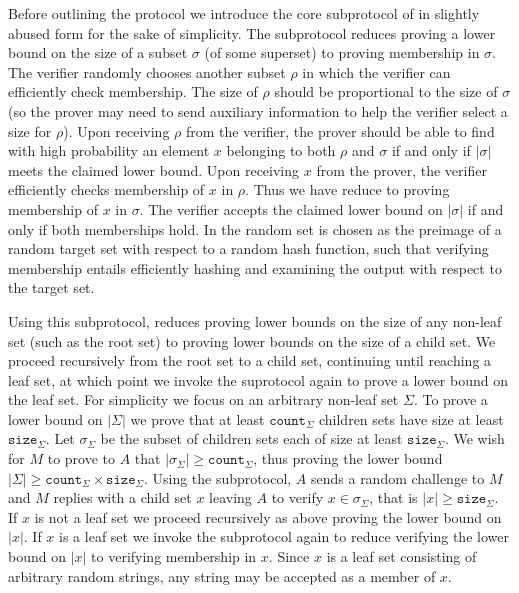 Before outlining the protocol we introduce the core subprotocol of \cite{GS86} in slightly abused form for the sake of simplicity.
The subprotocol reduces proving a lower bound on the size of a subset $\sigma$ (of some superset) to proving membership in $\sigma$.
The verifier randomly chooses another subset $\rho$ in which the verifier can efficiently check membership.
The size of $\rho$ should be proportional to the size of $\sigma$ (so the prover may need to send auxiliary information to help the verifier select a size for $\rho$).
Upon receiving $\rho$ from the verifier, the prover should be able to find with high probability an element $x$ belonging to both $\rho$ and $\sigma$ if and only if $|\sigma|$ meets the claimed lower bound.
Upon receiving $x$ from the prover, the verifier efficiently checks membership of $x$ in $\rho$.
Thus we have reduce to proving membership of $x$ in $\sigma$.
The verifier accepts the claimed lower bound on $|\sigma|$ if and only if both memberships hold.
In \cite{GS86} the random set is chosen as the preimage of a random target set with respect to a random hash function, such that verifying membership entails efficiently hashing and examining the output with respect to the target set.

Using this subprotocol, \cite{GS86} reduces proving lower bounds on the size of any non-leaf set (such as the root set) to proving lower bounds on the size of a child set.
We proceed recursively from the root set to a child set, continuing until reaching a leaf set, at which point we invoke the suprotocol again to prove a lower bound on the leaf set.
For simplicity we focus on an arbitrary non-leaf set $\Sigma$.
To prove a lower bound on $|\Sigma|$ we prove that at least $\texttt{count}_\Sigma$ children sets have size at least $\texttt{size}_\Sigma$.
Let $\sigma_\Sigma$ be the subset of children sets each of size at least $\texttt{size}_\Sigma$.
We wish for $M$ to prove to $A$ that $|\sigma_\Sigma|\geq\texttt{count}_\Sigma$, thus proving the lower bound $|\Sigma|\geq\texttt{count}_\Sigma\times\texttt{size}_\Sigma$.
Using the subprotocol, $A$ sends a random challenge to $M$ and $M$ replies with a child set $x$ leaving $A$ to verify $x\in\sigma_\Sigma$, that is $|x|\geq\texttt{size}_\Sigma$.
If $x$ is not a leaf set we proceed recursively as above proving the lower bound on $|x|$.
If $x$ is a leaf set we invoke the subprotocol again to reduce verifying the lower bound on $|x|$ to verifying membership in $x$.
Since $x$ is a leaf set consisting of arbitrary random strings, any string may be accepted as a member of $x$.


